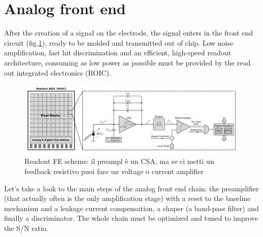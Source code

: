 \section{Analog front end}
   After the creation of a signal on the electrode, the signal enters in the front end circuit (fig.\ref{fig:readout_scheme}), ready to be molded and transmitted out of chip.
   Low noise amplification, fast hit discrimination and an efficient, high-speed readout architecture, consuming as low power as possible  must be provided by the read out integrated electronics (ROIC).\\
   \begin{figure}
      \centering
      \includegraphics[width=1.\linewidth]{figures/Pixel_detectors/readout_scheme.png}
      \caption{Readout FE scheme: il preampl è un CSA, ma se ci metti un feedback resistivo puoi fare un voltage o current amplifier}
      \label{fig:readout_scheme}
   \end{figure}
   Let's take a look to the main steps of the analog front end chain: the preamplifier (that actually often is the only amplification stage) with a reset to the baseline mechanism and a leakage current compensation, a shaper (a band-pass filter) and finally a discriminator. The whole chain must be optimized and tuned to improve the S/N ratio.

